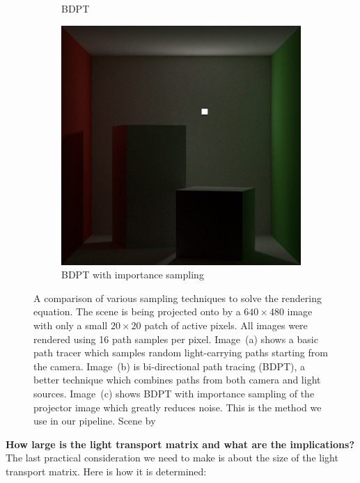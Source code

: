 \begin{figure}
\begin{subfigure}[b]{0.32\textwidth}
        \caption{BDPT}
        \vspace*{5mm}
        \label{fig:methods_sampling_bdpt}
    \end{subfigure}
    \hfill
    \begin{subfigure}[b]{0.32\textwidth}
        \centering
        \includegraphics[width=\textwidth]{images/03-sampling_bdpt_importance.jpg}
        \caption{BDPT with importance sampling}
        \label{fig:methods_sampling_bdpt_importance}
    \end{subfigure}
    \caption{A comparison of various sampling techniques to solve the rendering equation. The scene is being projected onto by a \(640 \times 480\) image with only a small \(20 \times 20\) patch of active pixels. All images were rendered using 16 path samples per pixel. Image~(a) shows a basic path tracer which samples random light-carrying paths starting from the camera. Image~(b) is bi-directional path tracing (BDPT), a better technique which combines paths from both camera and light sources. Image~(c) shows BDPT with importance sampling of the projector image which greatly reduces noise. This is the method we use in our pipeline. Scene by \citet{Bitterli16}}
    \label{fig:methods_sampling}
\end{figure}

\textbf{How large is the light transport matrix and what are the implications?} The last practical consideration we need to make is about the size of the light transport matrix. Here is how it is determined:

